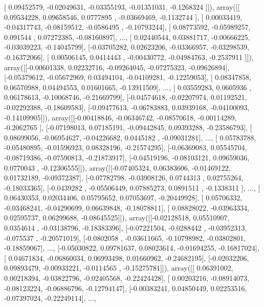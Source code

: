 \documentclass{article}
\begin{document}
       [ 0.09452579, -0.02049631, -0.03355193, -0.01351031, -0.1268324 ]]), array([[ 0.09534228,  0.09658546,  0.0777895 , -0.03669469, -0.1132744 ],
       [ 0.00033419, -0.04317743, -0.08159512, -0.0586495 , -0.10793244],
       [ 0.08773592, -0.05989257,  0.091544  ,  0.07272385, -0.08160897],
       ..., 
       [ 0.02440544,  0.03881717, -0.00666225, -0.03039223, -0.14045799],
       [-0.03705282,  0.02623206, -0.03366957, -0.03298539, -0.16372066],
       [ 0.00506145,  0.0414443 , -0.00430772, -0.04984763, -0.2537911 ]]), array([[-0.00601338,  0.02232716, -0.09264045, -0.07275323, -0.09626894],
       [-0.05379612, -0.05672969,  0.03494104, -0.04109281, -0.12259053],
       [ 0.08347858,  0.06570988,  0.04494553,  0.01601665, -0.13911509],
       ..., 
       [ 0.03559283,  0.0605936 ,  0.06178613, -0.10068746, -0.21669799],
       [-0.04574618, -0.02207974,  0.01192521, -0.02292388, -0.18609583],
       [-0.09477613, -0.06783883,  0.03939168, -0.04100093, -0.14109905]]), array([[-0.00418846, -0.06346742, -0.08570618, -0.00114289, -0.2062765 ],
       [-0.07198013,  0.07185191, -0.09442845,  0.09393288, -0.23586793],
       [ 0.08699056, -0.06954627, -0.04226682,  0.0445182 , -0.09031281],
       ..., 
       [ 0.05783788, -0.05480895, -0.01596923,  0.08328196, -0.21574295],
       [-0.06369083,  0.05545704, -0.08719386, -0.07590813, -0.21873917],
       [-0.04519196, -0.08103121,  0.09659036,  0.0770043 , -0.12306555]]), array([[-0.07405324,  0.06383606, -0.01469122,  0.01732189, -0.09372387],
       [-0.07782798, -0.03908126,  0.0744313 ,  0.02755264, -0.18033365],
       [-0.0439282 , -0.05506449,  0.07885273,  0.0891511 , -0.1338311 ],
       ..., 
       [ 0.06430353,  0.02034406,  0.05795652,  0.07053697, -0.20449928],
       [ 0.05706332, -0.03468241, -0.04290699,  0.06639848, -0.18078811],
       [ 0.08828022, -0.03963334,  0.02595737,  0.06299688, -0.08645525]]), array([[-0.02128518,  0.05510907,  0.0354614 , -0.03138796, -0.18383396],
       [-0.07221504, -0.0288442 , -0.03952313, -0.075537  , -0.20571019],
       [-0.0802058 , -0.03611665, -0.10798982, -0.03802801, -0.18859067],
       ..., 
       [-0.05030822,  0.09781637,  0.08023614, -0.01694255, -0.16817024],
       [ 0.04671834, -0.06860034,  0.06993498,  0.01660962, -0.24682195],
       [-0.02032206,  0.09893479, -0.00933221, -0.0114565 , -0.15275781]]), array([[ 0.06391002,  0.00218394, -0.03822796, -0.02405568, -0.22424428],
       [ 0.00203216, -0.08914073, -0.08123224, -0.06886796, -0.12794147],
       [-0.00383241,  0.04850449,  0.02253516, -0.07397024, -0.22249114],
       ..., 
\end{document}
